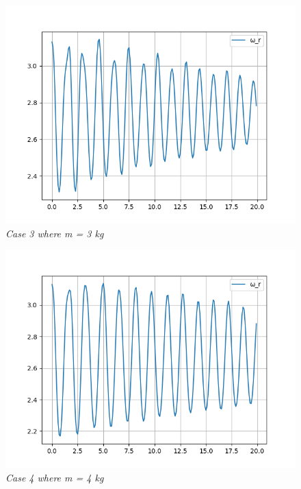         \begin{figure}[H]
            \centering
            \includegraphics{Appendix/RExpPictures/F/fm3.png}
            \caption{\textit{Case 3 where m = 3 kg}}
            \label{}
        \end{figure}
            
        \begin{figure}[H]
            \centering
            \includegraphics{Appendix/RExpPictures/F/fm4.png}
            \caption{\textit{Case 4 where m = 4 kg}}
            \label{}
        \end{figure}
            
